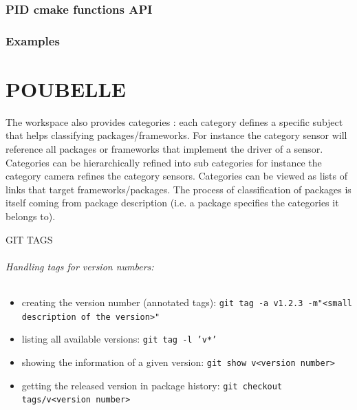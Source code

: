 \documentclass[12pt,a4paper]{article}
\begin{document}
\section{PID cmake functions API}
\label{sec:PIDCMakefunctionsAPI}


\section{Examples}
\label{sec:Examples}





\pagebreak

\part*{POUBELLE}




 The workspace also provides categories : each category defines a specific subject that helps classifying packages/frameworks. For instance the category sensor will reference all packages or frameworks that implement the driver of a sensor. Categories can be hierarchically refined into sub categories for instance the category camera refines the category sensors. Categories can be viewed as lists of links that target frameworks/packages. The process of classification of packages is itself coming from package description (i.e. a package specifies the categories it belongs to).
 
 
GIT TAGS
 
\paragraph{Handling tags for version numbers:}
\begin{itemize}
\item creating the version number (annotated tags):
\linebreak \texttt{git tag -a v1.2.3 -m"<small description of the version>"}
\item listing all available versions: 
\linebreak \texttt{git tag -l 'v*'}
\item showing the information of a given version: 
\linebreak \texttt{git show v<version number>}
\item getting the released version in package history: 
\linebreak \texttt{git checkout tags/v<version number>}
\end{itemize}
\end{document}
